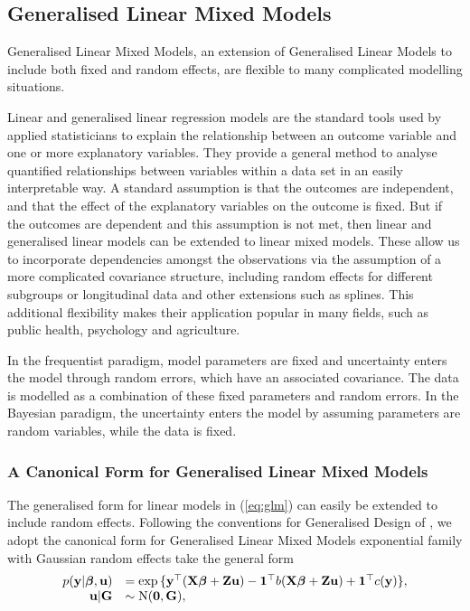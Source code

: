 \subsection{Generalised Linear Mixed Models}

Generalised Linear Mixed Models, an extension of Generalised Linear Models to
include both fixed and random effects, are flexible to many complicated
modelling situations.

Linear and generalised linear regression models are the standard tools used by
applied statisticians to explain the relationship between an outcome variable
and one or more explanatory variables. They provide a general method  to analyse
quantified relationships between variables within a data set in an easily
interpretable way. A standard assumption is that the outcomes are independent,
and that the effect of the explanatory variables on the outcome is fixed. But if
the outcomes are dependent and this assumption is not met, then linear and
generalised linear models can be extended to linear mixed models. These allow us
to incorporate dependencies amongst the  observations via the assumption of a
more complicated covariance structure, including random effects for  different
subgroups or longitudinal data and other extensions such as splines. This
additional flexibility makes their application popular in many fields, such as
public health, psychology and agriculture.

In the frequentist paradigm, model parameters are fixed and uncertainty enters
the model through random errors, which have an associated covariance. The data
is modelled as a combination of these fixed parameters and random errors. In the
Bayesian paradigm, the uncertainty enters the model by assuming parameters are
random variables, while the data is fixed.

\subsubsection{A Canonical Form for Generalised Linear Mixed Models}

The generalised form for linear models in  (\ref{eq:glm}) can easily be
extended to include random effects.  Following the conventions for Generalised
Design of \citep{Zhao2006}, we adopt the canonical form for Generalised Linear
Mixed Models exponential family with Gaussian random effects take the general
form
$$
\begin{array}{rl}\label{eq:glmm}
	p({\bf y} | {\boldsymbol \beta}, {\bf u}) &= \exp{\{ {\bf y}^\top ({\bf X}{\boldsymbol\beta}+ {\bf Z}{\bf u}) - {\bf1}^\top b({\bf X}{\boldsymbol\beta}+ {\bf Z}{\bf u}) + {\bf1}^\top c({\bf y}) \}}, \\
	{\bf u} | {\bf G} &\sim \text{N}({\bf 0}, {\bf G}),
\end{array}
$$

